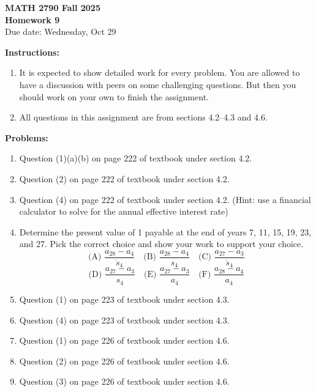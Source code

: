 \documentclass[12pt]{article}
\begin{document}
\begin{center}
\textbf{\Large MATH 2790 Fall 2025}\\[1em]
\textbf{\Large Homework 9}\\[0.5em]
Due date: Wednesday, Oct 29
\end{center}

\bigskip

\textbf{Instructions:}

\begin{enumerate}[label=(\alph*)]
\item It is expected to show detailed work for every problem. You are allowed to have a
discussion with peers on some challenging questions. But then you should work on
your own to finish the assignment.

\item All questions in this assignment are from sections 4.2--4.3 and 4.6.
\end{enumerate}

\bigskip

\textbf{Problems:}

\begin{enumerate}
\item Question (1)(a)(b) on page 222 of textbook under section 4.2.

\item Question (2) on page 222 of textbook under section 4.2. 

\item Question (4) on page 222 of textbook under section 4.2. (Hint: use a financial calculator to solve for the annual effective interest rate)

\item Determine the present value of 1 payable at the end of years 7, 11, 15, 19, 23, and 27.
Pick the correct choice and show your work to support your choice.
\[
\text{(A) }\dfrac{a_{28}-a_{4}}{\ddot{s}_{4}}
\quad
\text{(B) }\dfrac{a_{28}-a_{4}}{s_{4}}
\quad
\text{(C) }\dfrac{a_{27}-a_{3}}{\ddot{s}_{4}}
\]
\[
\text{(D) }\dfrac{a_{27}-a_{3}}{s_{4}}
\quad
\text{(E) }\dfrac{a_{27}-a_{3}}{a_{4}}
\quad
\text{(F) }\dfrac{a_{28}-a_{4}}{a_{4}}
\]

\item Question (1) on page 223 of textbook under section 4.3.

\item Question (4) on page 223 of textbook under section 4.3.

\item Question (1) on page 226 of textbook under section 4.6.

\item Question (2) on page 226 of textbook under section 4.6.

\item Question (3) on page 226 of textbook under section 4.6.
\end{enumerate}
\end{document}
